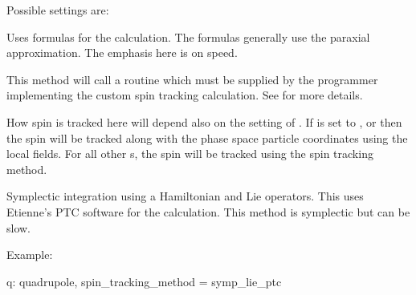 Possible  settings are:
\begin{description}

\item[\vn{Bmad_Standard}] \Newline
Uses formulas for the calculation. The formulas generally use the
paraxial approximation. The emphasis here is on speed.

\item[\vn{Custom}] \Newline
This method will call a routine  which must be
supplied by the programmer implementing the custom spin tracking
calculation. See  for more details.

\item[\vn{Tracking}] \Newline
How spin is tracked here will depend also on the setting of
. If  is set to , or
 then the spin will be tracked along with the phase
space particle coordinates using the local fields. For all other
s, the spin will be tracked using the
 spin tracking method.

\item[\vn{Symp_Lie_PTC}] \Newline
Symplectic integration using a Hamiltonian and Lie operators.
This uses Etienne's PTC software for the calculation.
This method is symplectic but can be slow.

\end{description}

Example:
\begin{example}
  q: quadrupole, spin_tracking_method = symp_lie_ptc
\end{example}


